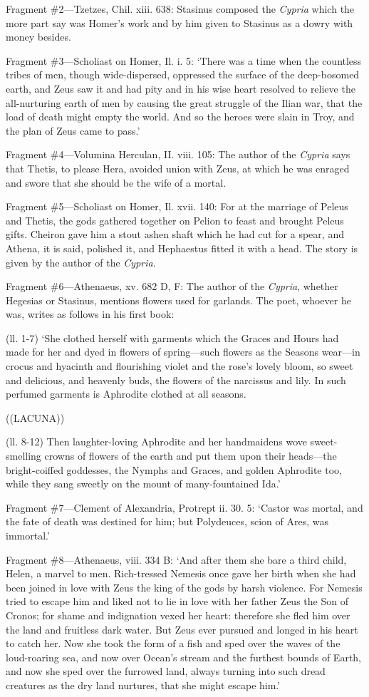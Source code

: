 Fragment \#2—Tzetzes, Chil. xiii. 638: Stasinus composed the
\emph{Cypria} which the more part say was Homer’s work and by him
given to Stasinus as a dowry with money besides.

Fragment \#3—Scholiast on Homer, Il. i. 5: ‘There was a time when
the countless tribes of men, though wide-dispersed, oppressed the surface of
the deep-bosomed earth, and Zeus saw it and had pity and in his wise heart
resolved to relieve the all-nurturing earth of men by causing the great
struggle of the Ilian war, that the load of death might empty the world. And so
the heroes were slain in Troy, and the plan of Zeus came to pass.’

Fragment \#4—Volumina Herculan, II. viii. 105: The author of the
\emph{Cypria} says that Thetis, to please Hera, avoided union with Zeus,
at which he was enraged and swore that she should be the wife of a mortal.

Fragment \#5—Scholiast on Homer, Il. xvii. 140: For at the marriage of
Peleus and Thetis, the gods gathered together on Pelion to feast and brought
Peleus gifts. Cheiron gave him a stout ashen shaft which he had cut for a
spear, and Athena, it is said, polished it, and Hephaestus fitted it with a
head. The story is given by the author of the \emph{Cypria}.

Fragment \#6—Athenaeus, xv. 682 D, F: The author of the
\emph{Cypria}, whether Hegesias or Stasinus, mentions flowers used for
garlands. The poet, whoever he was, writes as follows in his first book:

(ll. 1-7) ‘She clothed herself with garments which the Graces and Hours
had made for her and dyed in flowers of spring—such flowers as the
Seasons wear—in crocus and hyacinth and flourishing violet and the
rose’s lovely bloom, so sweet and delicious, and heavenly buds, the
flowers of the narcissus and lily. In such perfumed garments is Aphrodite
clothed at all seasons.

((LACUNA))

(ll. 8-12) Then laughter-loving Aphrodite and her handmaidens wove
sweet-smelling crowns of flowers of the earth and put them upon their
heads—the bright-coiffed goddesses, the Nymphs and Graces, and golden
Aphrodite too, while they sang sweetly on the mount of many-fountained
Ida.’

Fragment \#7—Clement of Alexandria, Protrept ii. 30. 5: ‘Castor was
mortal, and the fate of death was destined for him; but Polydeuces, scion of
Ares, was immortal.’

Fragment \#8—Athenaeus, viii. 334 B: ‘And after them she bare a
third child, Helen, a marvel to men. Rich-tressed Nemesis once gave her birth
when she had been joined in love with Zeus the king of the gods by harsh
violence. For Nemesis tried to escape him and liked not to lie in love with her
father Zeus the Son of Cronos; for shame and indignation vexed her heart:
therefore she fled him over the land and fruitless dark water. But Zeus ever
pursued and longed in his heart to catch her. Now she took the form of a fish
and sped over the waves of the loud-roaring sea, and now over Ocean’s
stream and the furthest bounds of Earth, and now she sped over the furrowed
land, always turning into such dread creatures as the dry land nurtures, that
she might escape him.’

